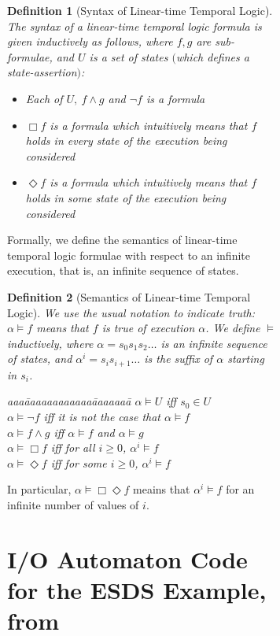 \documentclass[11pt]{article}
\newcommand{\be}{\begin{itemize}}
\newcommand{\ee}{\end{itemize}}
\newcommand{\bd}{\begin{definition}}
\newcommand{\ed}{\end{definition}}
\newcommand{\sat}{\models}
\newcommand{\al}{\alpha}
\newcommand{\iof}{\Box \Diamond}
\newcommand{\always}{\Box}
\newcommand{\eventually}{\Diamond}
\newtheorem{definition}{Definition}
\begin{document}
\begin{figure}[htb]
\begin{figure}[htb]
\bd[Syntax of Linear-time Temporal Logic]
\label{def:TL-syntax}
The syntax of a linear-time temporal logic formula is given inductively 
as follows, where $f,g$ are sub-formulae, and $U$ is a set of states
$($which defines a state-assertion$)$\textup{:}
\be

\item Each of $U,\ f \land g$ and $\neg f$ is a formula

\item $\always  f$ is a formula which intuitively means that $f$
      holds in every state of the execution being considered

\item $\eventually  f$ is a formula which intuitively means that $f$
      holds in some state of the execution being considered

\ee
\ed

Formally, we define the semantics of linear-time temporal logic
formulae with respect to an infinite execution, that is, an infinite
sequence of states.


\bd[Semantics of Linear-time Temporal Logic]
We use the usual notation to indicate truth:
$\al \sat f$ means that $f$ is true of execution $\al$.
We define $\sat$ inductively, where $\al = s_0 s_1 s_2 \ldots$
is an infinite sequence of states, and
$\al^i = s_i s_{i+1} \ldots$ is the suffix of $\al$ starting in $s_i$.

\begin{tabbing}
aaa\=              aaaaaaaaaaaa\= aaaaaaa\=        \kill
   \>$\al \sat U$              \>iff     \>$s_0 \in U$\\
   \>$\al \sat \neg f$         \>iff     \>it is not the case that $\al \sat f$\\
   \>$\al \sat f \land g$      \>iff     \>$\al \sat f$ and $\al \sat g$\\
   \>$\al \sat \always f$      \>iff     \>for all $i \ge 0$, $\al^i \sat f$\\
   \>$\al \sat \eventually f$  \>iff     \>for some $i \ge 0$, $\al^i \sat f$
\end{tabbing}
\ed
In particular, $\al \sat \iof f$ meains that $\al^i \sat f$ for an
infinite number of values of $i$.




\newpage
\section{I/O Automaton Code for the ESDS Example, from \protect \cite{FGLLS99}}
\label{app:esds}





\end{figure}
\end{figure}
\end{document}
